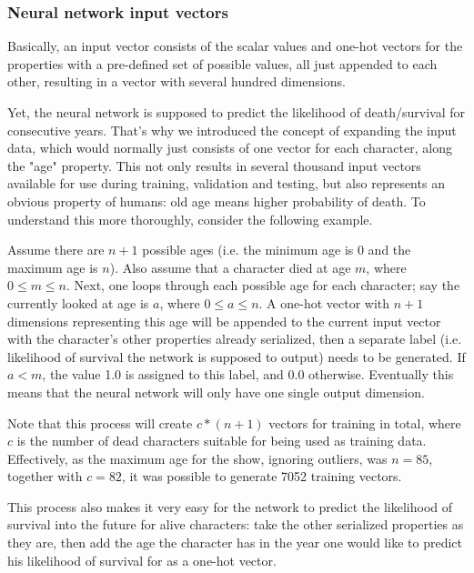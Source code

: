 \documentclass{bioinfo}
\begin{document}
\subsubsection{Neural network input vectors}

Basically, an input vector consists of the scalar values and one-hot vectors for the properties with a pre-defined set of possible values, all just appended to each other, resulting in a vector with several hundred dimensions.

Yet, the neural network is supposed to predict the likelihood of death/survival for consecutive years. That's why we introduced the concept of expanding the input data, which would normally just consists of one vector for each character, along the "age" property. This not only results in several thousand input vectors available for use during training, validation and testing, but also represents an obvious property of humans: old age means higher probability of death. To understand this more thoroughly, consider the following example.

Assume there are $n+1$ possible ages (i.e. the minimum age is $0$ and the maximum age is $n$). Also assume that a character died at age $m$, where $0\leq m\leq n$. Next, one loops through each possible age for each character; say the currently looked at age is $a$, where $0\leq a\leq n$. A one-hot vector with $n+1$ dimensions representing this age will be appended to the current input vector with the character's other properties already serialized, then a separate label (i.e. likelihood of survival the network is supposed to output) needs to be generated. If $a<m$, the value 1.0 is assigned to this label, and 0.0 otherwise. Eventually this means that the neural network will only have one single output dimension.

Note that this process will create $c*(n+1)$ vectors for training in total, where $c$ is the number of dead characters suitable for being used as training data. Effectively, as the maximum age for the show, ignoring outliers, was $n=85$, together with $c=82$, it was possible to generate 7052 training vectors.

This process also makes it very easy for the network to predict the likelihood of survival into the future for alive characters: take the other serialized properties as they are, then add the age the character has in the year one would like to predict his likelihood of survival for as a one-hot vector.


\end{document}
